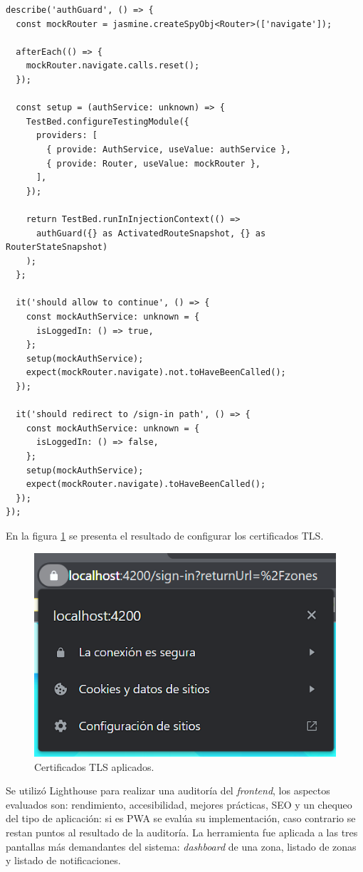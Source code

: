 \begin{lstlisting}[label=cod:unitTestFrontend,caption=Prueba unitaria del \emph{guard} de autenticación de rutas.]
describe('authGuard', () => {
  const mockRouter = jasmine.createSpyObj<Router>(['navigate']);

  afterEach(() => {
    mockRouter.navigate.calls.reset();
  });

  const setup = (authService: unknown) => {
    TestBed.configureTestingModule({
      providers: [
        { provide: AuthService, useValue: authService },
        { provide: Router, useValue: mockRouter },
      ],
    });

    return TestBed.runInInjectionContext(() =>
      authGuard({} as ActivatedRouteSnapshot, {} as RouterStateSnapshot)
    );
  };

  it('should allow to continue', () => {
    const mockAuthService: unknown = {
      isLoggedIn: () => true,
    };
    setup(mockAuthService);
    expect(mockRouter.navigate).not.toHaveBeenCalled();
  });

  it('should redirect to /sign-in path', () => {
    const mockAuthService: unknown = {
      isLoggedIn: () => false,
    };
    setup(mockAuthService);
    expect(mockRouter.navigate).toHaveBeenCalled();
  });
});
\end{lstlisting}

En la figura \ref{fig:certificadosTLSDelFrontendAplicados} se presenta el resultado de configurar los certificados TLS.

\begin{figure}[H]
	\centering
	\includegraphics[width=.5\textwidth]{./Figures/Frontend certificados TLS.png}
	\caption{Certificados TLS aplicados.}
	\label{fig:certificadosTLSDelFrontendAplicados}
\end{figure} 

Se utilizó Lighthouse para realizar una auditoría del \emph{frontend}, los aspectos evaluados son: rendimiento, accesibilidad, mejores prácticas, SEO y un chequeo del tipo de aplicación: si es PWA se evalúa su implementación, caso contrario se restan puntos al resultado de la auditoría. La herramienta fue aplicada a las tres pantallas más demandantes del sistema: \emph{dashboard} de una zona, listado de zonas y listado de notificaciones.

